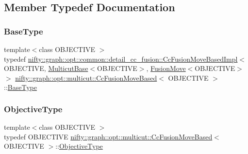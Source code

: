 \subsection{Member Typedef Documentation}
\mbox{\label{classnifty_1_1graph_1_1opt_1_1multicut_1_1CcFusionMoveBased_abcaa1195c99c6748f91ec07288e9bdc2}} 
\subsubsection{\texorpdfstring{Base\+Type}{BaseType}}
{\footnotesize\ttfamily template$<$class O\+B\+J\+E\+C\+T\+I\+VE $>$ \\
typedef \hyperlink{classnifty_1_1graph_1_1opt_1_1common_1_1detail__cc__fusion_1_1CcFusionMoveBasedImpl}{nifty\+::graph\+::opt\+::common\+::detail\+\_\+cc\+\_\+fusion\+::\+Cc\+Fusion\+Move\+Based\+Impl}$<$ O\+B\+J\+E\+C\+T\+I\+VE, \hyperlink{classnifty_1_1graph_1_1opt_1_1multicut_1_1MulticutBase}{Multicut\+Base}$<$O\+B\+J\+E\+C\+T\+I\+VE$>$, \hyperlink{classnifty_1_1graph_1_1opt_1_1multicut_1_1FusionMove}{Fusion\+Move}$<$O\+B\+J\+E\+C\+T\+I\+VE$>$ $>$ \hyperlink{classnifty_1_1graph_1_1opt_1_1multicut_1_1CcFusionMoveBased}{nifty\+::graph\+::opt\+::multicut\+::\+Cc\+Fusion\+Move\+Based}$<$ O\+B\+J\+E\+C\+T\+I\+VE $>$\+::\hyperlink{classnifty_1_1graph_1_1opt_1_1multicut_1_1CcFusionMoveBased_abcaa1195c99c6748f91ec07288e9bdc2}{Base\+Type}}

\mbox{\label{classnifty_1_1graph_1_1opt_1_1multicut_1_1CcFusionMoveBased_a36f47f4066a3a686514ed6a505608345}} 
\subsubsection{\texorpdfstring{Objective\+Type}{ObjectiveType}}
{\footnotesize\ttfamily template$<$class O\+B\+J\+E\+C\+T\+I\+VE $>$ \\
typedef O\+B\+J\+E\+C\+T\+I\+VE \hyperlink{classnifty_1_1graph_1_1opt_1_1multicut_1_1CcFusionMoveBased}{nifty\+::graph\+::opt\+::multicut\+::\+Cc\+Fusion\+Move\+Based}$<$ O\+B\+J\+E\+C\+T\+I\+VE $>$\+::\hyperlink{classnifty_1_1graph_1_1opt_1_1multicut_1_1CcFusionMoveBased_a36f47f4066a3a686514ed6a505608345}{Objective\+Type}}

